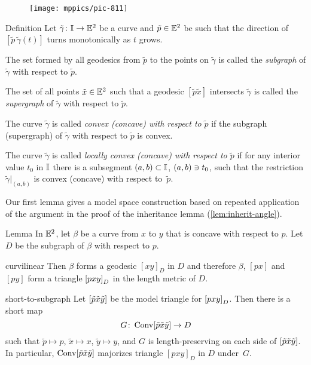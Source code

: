 \begin{wrapfigure}{r}{38 mm}
\vskip-0mm
\centering
\texttt{[image: mppics/pic-811]}
\end{wrapfigure}

\begin{thm}{Definition}\label{def:convex-devel}
Let $\tilde \gamma\colon\mathbb{I}\to\mathbb{E}^2$ be a curve and $\tilde p\in\mathbb{E}^2$ be such that the direction of $[\tilde p\,\tilde \gamma(t)]$ turns monotonically as $t$ grows.

The set formed by all geodesics from  $\tilde p$ to the points on $\tilde \gamma$ is called the  \emph{subgraph} of $\tilde \gamma$ with respect to $\tilde p$.

The set of all points $\tilde x\in\mathbb{E}^2$ such that a geodesic $[\tilde p\tilde x]$ intersects $\tilde \gamma$ is called the \emph{supergraph} of $\tilde \gamma$ with respect to $\tilde p$.

The curve $\tilde \gamma$ is called \emph{convex (concave) with respect to} $\tilde p$ if the subgraph (supergraph) of $\tilde \gamma$ with respect to $\tilde p$ is convex.

The curve $\tilde \gamma$ is called 
\emph{locally convex (concave) with respect to $\tilde p$} 
if for any interior value $t_0$ in $\mathbb{I}$ there is a subsegment $(a,b)\subset\mathbb{I}$, $(a,b)\z\ni t_0$, such that the restriction $\tilde \gamma|_{(a,b)}$ is convex (concave) with respect to~$\tilde p$.
\end{thm}

Our first lemma gives a model space construction based on repeated application of the argument in the proof of the inheritance lemma (\ref{lem:inherit-angle}).

\begin{thm}{Lemma}\label{lem:majorize-subgraph}
In $\mathbb{E}^2$, let  
$\beta$ be a curve from $x$ to $y$ 
that is concave with respect  to $p$.
Let $D$  be the subgraph of $\beta$ with respect to $p$.
\begin{subthm}{curvilinear} 
Then $\beta$ forms a geodesic $[x y]_D$ in $D$ and therefore $\beta$, $[p x]$ and $[p y]$ form a triangle 
${[pxy]}_D$ in the length metric of $D$.
\end{subthm}
\begin{subthm} {short-to-subgraph}
Let $[\tilde p\tilde x\tilde y]$ be the model triangle for 
${[pxy]}_D$.
Then there is a short map 
\[G\colon\mathop{\rm Conv}\nolimits[\tilde p\tilde x\tilde y]\to D\]
such that $\tilde p\mapsto p$, $\tilde x\mapsto x$, $\tilde y\mapsto y$, and $G$ is length-preserving on each side of $[\tilde p\tilde x\tilde y]$.
In particular, $\mathop{\rm Conv}\nolimits[\tilde p\tilde x\tilde y]$ majorizes triangle $[p x y]_D$ in $D$ under~$G$.
\end{subthm}
\end{thm} 


